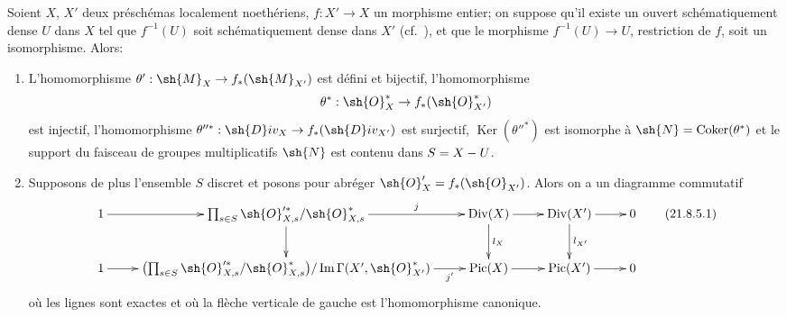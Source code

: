 \begin{proposition}[21.8.5]
\label{IV.21.8.5}
Soient $X$, $X'$ deux préschémas localement noethériens, $f:X'\to X$ un morphisme entier;
on suppose qu'il existe un ouvert schématiquement dense $U$ dans $X$ tel que $f^{-1}(U)$ soit schématiquement dense dans $X'$ \textup{(cf.\ )}, et que le morphisme $f^{-1}(U)\to U$, restriction de $f$, soit un isomorphisme.
Alors:
\begin{enumerate}[label=\textup{(\roman*)}]
  \item L'homomorphisme $\theta':\sh{M}_X\to f_*(\sh{M}_{X'})$ est défini et bijectif, l'homomorphisme
\[
  \theta^*:\sh{O}^*_X\to f_*(\sh{O}^*_{X'})
\]
est injectif, l'homomorphisme $\theta''^*:\sh{D}iv_X\to f_*(\sh{D}iv_{X'})$ est surjectif, $\operatorname{Ker}(\theta''^*)$ est isomorphe à $\sh{N}=\operatorname{Coker}(\theta^*)$ et le support du faisceau de groupes multiplicatifs $\sh{N}$ est contenu dans $S=X- U$.
  \item Supposons de plus l'ensemble $S$ discret et posons pour abréger $\sh{O}'_X=f_*(\sh{O}_{X'})$.
Alors on a un diagramme commutatif
\[
\label{IV.21.8.5.1}
  \xymatrix{
    1 \ar[r] & \prod_{s\in S}\sh{O}'^{*}_{X,s}/\sh{O}^*_{X,s} \ar[r]^-{j} \ar[d] & \operatorname{Div}(X) \ar[r] \ar[d]^{l_X} & \operatorname{Div}(X') \ar[r] \ar[d]^{l_{X'}} & 0\\
    1 \ar[r] & \bigl(\prod_{s\in S}\sh{O}'^{*}_{X,s}/\sh{O}^*_{X,s}\bigr)/\operatorname{Im}\Gamma(X',\sh{O}^*_{X'}) \ar[r]_-{j'} & \operatorname{Pic}(X) \ar[r] & \operatorname{Pic}(X') \ar[r] & 0
  }
  \tag{21.8.5.1}
\]
où les lignes sont exactes et où la flèche verticale de gauche est l'homomorphisme canonique.
\end{enumerate}
\end{proposition}

